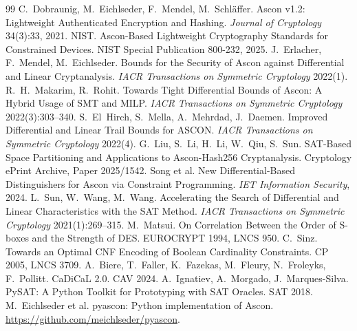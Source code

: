 \documentclass[11pt,a4paper]{article}
\begin{document}
\begin{thebibliography}{99}
 C.~Dobraunig, M.~Eichlseder, F.~Mendel, M.~Schl\"affer.
  Ascon v1.2: Lightweight Authenticated Encryption and Hashing.
  \emph{Journal of Cryptology} 34(3):33, 2021.
 NIST. Ascon-Based Lightweight Cryptography Standards for Constrained
  Devices. NIST Special Publication 800-232, 2025.
 J.~Erlacher, F.~Mendel, M.~Eichlseder.
  Bounds for the Security of Ascon against Differential and Linear Cryptanalysis.
  \emph{IACR Transactions on Symmetric Cryptology} 2022(1).
 R.~H.~Makarim, R.~Rohit.
  Towards Tight Differential Bounds of Ascon: A Hybrid Usage of SMT and MILP.
  \emph{IACR Transactions on Symmetric Cryptology} 2022(3):303--340.
 S.~El~Hirch, S.~Mella, A.~Mehrdad, J.~Daemen.
  Improved Differential and Linear Trail Bounds for ASCON.
  \emph{IACR Transactions on Symmetric Cryptology} 2022(4).
 G.~Liu, S.~Li, H.~Li, W.~Qiu, S.~Sun.
  SAT-Based Space Partitioning and Applications to Ascon-Hash256 Cryptanalysis.
  Cryptology ePrint Archive, Paper 2025/1542.
 Song et al. New Differential-Based Distinguishers for Ascon via Constraint Programming.
  \emph{IET Information Security}, 2024.
 L.~Sun, W.~Wang, M.~Wang.
  Accelerating the Search of Differential and Linear Characteristics with the SAT Method.
  \emph{IACR Transactions on Symmetric Cryptology} 2021(1):269--315.
 M.~Matsui. On Correlation Between the Order of S-boxes and the Strength of DES.
  EUROCRYPT 1994, LNCS 950.
 C.~Sinz. Towards an Optimal CNF Encoding of Boolean Cardinality Constraints.
  CP 2005, LNCS 3709.
 A.~Biere, T.~Faller, K.~Fazekas, M.~Fleury, N.~Froleyks, F.~Pollitt.
  CaDiCaL 2.0. CAV 2024.
 A.~Ignatiev, A.~Morgado, J.~Marques-Silva.
  PySAT: A Python Toolkit for Prototyping with SAT Oracles. SAT 2018.
 M.~Eichlseder et al. pyascon: Python implementation of Ascon.
  \url{https://github.com/meichlseder/pyascon}.
\end{thebibliography}
\end{document}
